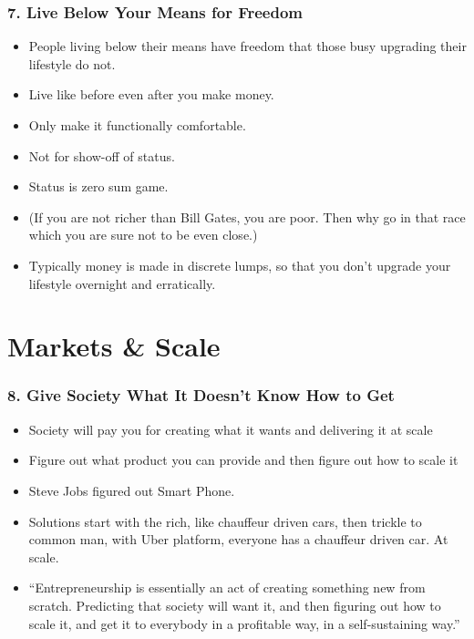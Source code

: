 \begin{frame}[fragile]
\frametitle{7. Live Below Your Means for Freedom}
\begin{itemize}
\item People living below their means have freedom that those busy upgrading their lifestyle do not.
\item Live like before even after you make money. 
\item Only make it functionally comfortable.
\item Not for show-off of status. 
\item Status is zero sum game.
\item (If you are not richer than Bill Gates, you are poor. Then why go in that race which you are sure not to be even close.)
\item Typically money is made in discrete lumps, so that you don't upgrade your lifestyle overnight and erratically.
\end{itemize}
\end{frame}


\section{Markets \& Scale}

\begin{frame}[fragile]
\frametitle{8. Give Society What It Doesn't Know How to Get}
\begin{itemize}
\item Society will pay you for creating what it wants and delivering it at scale
\item Figure out what product you can provide and then figure out how to scale it
\item Steve Jobs figured out Smart Phone.
\item Solutions start with the rich, like chauffeur driven cars, then trickle to common man, with Uber platform, everyone has a chauffeur driven car. At scale.
\item ``Entrepreneurship is essentially an act of creating something new from scratch. Predicting that society will want it, and then figuring out how to scale it, and get it to everybody in a profitable way, in a self-sustaining way.''
\end{itemize}
\end{frame}

